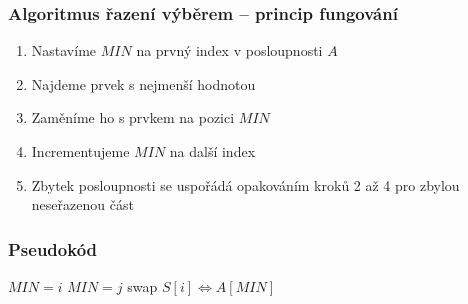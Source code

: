\documentclass[12pt, hyperref={unicode}]{beamer}
\begin{document}
\begin{frame}
	\frametitle{Algoritmus řazení výběrem -- princip fungování }
	\begin{enumerate}
		\item Nastavíme $MIN$ na prvný index v posloupnosti $A$
			\pause		
		\item Najdeme prvek s nejmenší hodnotou
			\pause
		\item Zaměníme ho s prvkem na pozici $MIN$
			\pause
		\item Incrementujeme $MIN$ na další index
			\pause
		\item Zbytek posloupnosti se uspořádá opakováním kroků 2 až 4 pro zbylou neseřazenou část
	\end{enumerate}
\end{frame}

\begin{frame}
	\frametitle{Pseudokód}
	
	\begin{algorithmic}[1]
			\STATE $MIN = i$
					\STATE $MIN = j$
				\ENDIF				
			\ENDFOR		
			\STATE swap $S[i] \Leftrightarrow A[MIN]$		
		\ENDFOR
	\end{algorithmic}
\end{frame}
\end{document}
